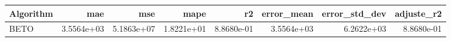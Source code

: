 \begin{tabular}{lrrrrrrr}
\toprule
Algorithm & mae & mse & mape & r2 & error_mean & error_std_dev & adjuste_r2 \\
\midrule
BETO & 3.5564e+03 & 5.1863e+07 & 1.8221e+01 & 8.8680e-01 & 3.5564e+03 & 6.2622e+03 & 8.8680e-01 \\
\bottomrule
\end{tabular}
